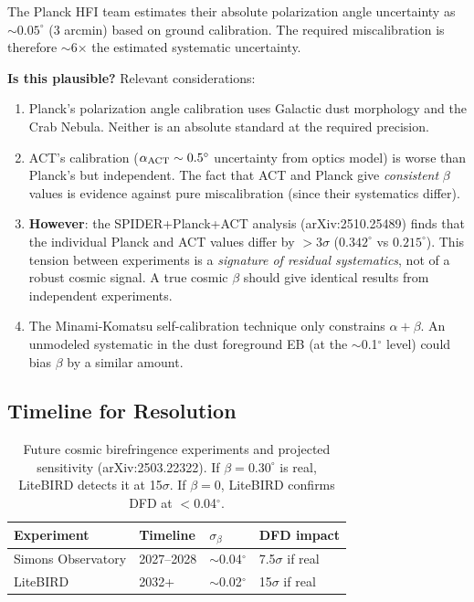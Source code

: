 \documentclass[11pt]{article}
\begin{document}
The Planck HFI team estimates their absolute polarization angle uncertainty
as $\sim 0.05^\circ$ (3 arcmin) based on ground calibration. The required
miscalibration is therefore $\sim$6$\times$ the estimated systematic
uncertainty.

\textbf{Is this plausible?} Relevant considerations:
\begin{enumerate}
\item Planck's polarization angle calibration uses Galactic dust morphology
  and the Crab Nebula. Neither is an absolute standard at the required
  precision.
\item ACT's calibration ($\alpha_{\rm ACT} \sim 0.5^\circ$ uncertainty from
  optics model) is worse than Planck's but independent. The fact that ACT
  and Planck give \emph{consistent} $\beta$ values is evidence against
  pure miscalibration (since their systematics differ).
\item \textbf{However}: the SPIDER+Planck+ACT analysis (arXiv:2510.25489)
  finds that the individual Planck and ACT values differ by $>$3$\sigma$
  ($0.342^\circ$ vs $0.215^\circ$). This tension between experiments
  is a \emph{signature of residual systematics}, not of a robust cosmic
  signal. A true cosmic $\beta$ should give identical results from
  independent experiments.
\item The Minami-Komatsu self-calibration technique only constrains
  $\alpha + \beta$. An unmodeled systematic in the dust foreground EB
  (at the $\sim$0.1$^\circ$ level) could bias $\beta$ by a similar amount.
\end{enumerate}

\subsection{Timeline for Resolution}

\begin{table}[h]
\centering
\begin{tabular}{llll}
\toprule
\textbf{Experiment} & \textbf{Timeline} & $\sigma_\beta$ & \textbf{DFD impact} \\
\midrule
Simons Observatory & 2027--2028 & $\sim$0.04$^\circ$ & 7.5$\sigma$ if real \\
LiteBIRD & 2032+ & $\sim$0.02$^\circ$ & 15$\sigma$ if real \\
\bottomrule
\end{tabular}
\caption{Future cosmic birefringence experiments and projected sensitivity
  (arXiv:2503.22322). If $\beta = 0.30^\circ$ is real, LiteBIRD detects
  it at 15$\sigma$. If $\beta = 0$, LiteBIRD confirms DFD at $<$0.04$^\circ$.}
\end{table}
\end{document}
